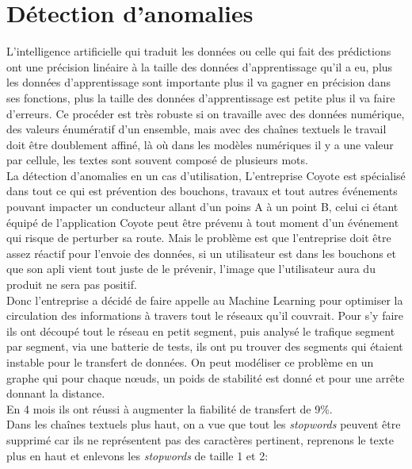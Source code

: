 \section{Détection d'anomalies}
L’intelligence artificielle qui traduit les données ou celle qui fait des prédictions ont une précision linéaire à la taille des données d'apprentissage qu'il a eu, plus les données d'apprentissage sont importante plus il va gagner en précision dans ses fonctions, plus la taille des données d'apprentissage est petite plus il va faire d'erreurs. Ce procéder est très robuste si on travaille avec des données numérique, des valeurs énumératif d'un ensemble, mais avec des chaînes textuels le travail doit être doublement affiné, là où dans les modèles numériques il y a une valeur par cellule, les textes sont souvent composé de plusieurs mots.\\
\linebreak
La détection d'anomalies en un cas d'utilisation, L'entreprise Coyote  est spécialisé dans tout ce qui est prévention des bouchons, travaux et tout autres événements pouvant impacter un conducteur allant d'un poins A à un point B, celui ci étant équipé de l'application Coyote peut être prévenu à tout moment d'un événement qui risque de perturber sa route. Mais le problème est  que l'entreprise doit être assez réactif pour l'envoie des données, si un utilisateur est dans les bouchons et que son apli vient tout juste de le prévenir, l'image que l'utilisateur aura du produit ne sera pas positif.\\
Donc l'entreprise a décidé de faire appelle au Machine Learning pour optimiser la circulation des informations à travers tout le réseaux qu'il couvrait. Pour s'y faire ils ont découpé tout le réseau en petit segment, puis analysé le trafique segment par segment, via une batterie de tests, ils ont pu trouver des segments qui étaient instable pour le transfert de données. On peut modéliser ce problème en un graphe qui pour chaque nœuds, un poids de stabilité est donné et pour une arrête donnant la distance.\\
\linebreak
En 4 mois ils ont réussi à augmenter la fiabilité de transfert de 9\%.\\

Dans les chaînes textuels plus haut, on a vue que tout les \textit{stopwords} peuvent être supprimé car ils ne représentent pas des caractères pertinent, reprenons le texte plus en haut et enlevons les \textit{stopwords} de taille 1 et 2:\\

